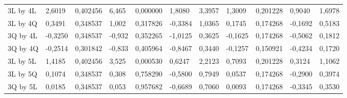 \begin{table}[H]
{\begin{tabular}{lllllllllll}
\rowcolor[HTML]{FFFFFF} 
3L by 4L       & {\color[HTML]{FF0000} 2,6019}   & {\color[HTML]{FF0000} 0,402456} & {\color[HTML]{FF0000} 6,465}    & {\color[HTML]{FF0000} 0,000000} & {\color[HTML]{FF0000} 1,8080}   & {\color[HTML]{FF0000} 3,3957}   & {\color[HTML]{FF0000} 1,3009}   & {\color[HTML]{FF0000} 0,201228} & {\color[HTML]{FF0000} 0,9040}   & {\color[HTML]{FF0000} 1,6978}   \\
\rowcolor[HTML]{FFFFFF} 
3L by 4Q       & 0,3491                          & 0,348537                        & 1,002                           & 0,317826                        & -0,3384                         & 1,0365                          & 0,1745                          & 0,174268                        & -0,1692                         & 0,5183                          \\
\rowcolor[HTML]{FFFFFF} 
3Q by 4L       & -0,3250                         & 0,348537                        & -0,932                          & 0,352265                        & -1,0125                         & 0,3625                          & -0,1625                         & 0,174268                        & -0,5062                         & 0,1812                          \\
\rowcolor[HTML]{FFFFFF} 
3Q by 4Q       & -0,2514                         & 0,301842                        & -0,833                          & 0,405964                        & -0,8467                         & 0,3440                          & -0,1257                         & 0,150921                        & -0,4234                         & 0,1720                          \\
\rowcolor[HTML]{FFFFFF} 
3L by 5L       & {\color[HTML]{FF0000} 1,4185}   & {\color[HTML]{FF0000} 0,402456} & {\color[HTML]{FF0000} 3,525}    & {\color[HTML]{FF0000} 0,000530} & {\color[HTML]{FF0000} 0,6247}   & {\color[HTML]{FF0000} 2,2123}   & {\color[HTML]{FF0000} 0,7093}   & {\color[HTML]{FF0000} 0,201228} & {\color[HTML]{FF0000} 0,3124}   & {\color[HTML]{FF0000} 1,1062}   \\
\rowcolor[HTML]{FFFFFF} 
3L by 5Q       & 0,1074                          & 0,348537                        & 0,308                           & 0,758290                        & -0,5800                         & 0,7949                          & 0,0537                          & 0,174268                        & -0,2900                         & 0,3974                          \\
\rowcolor[HTML]{FFFFFF} 
3Q by 5L       & 0,0185                          & 0,348537                        & 0,053                           & 0,957682                        & -0,6689                         & 0,7060                          & 0,0093                          & 0,174268                        & -0,3345                         & 0,3530                          \\

\end{tabular}}
\end{table}
